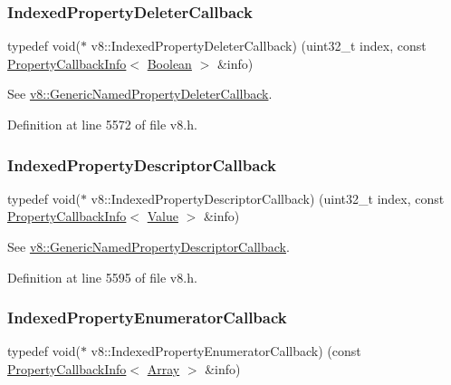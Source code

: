 \mbox{\label{namespacev8_a53863728de14cde48dd6543207b2f2da}} 
\subsubsection{\texorpdfstring{Indexed\+Property\+Deleter\+Callback}{IndexedPropertyDeleterCallback}}
{\footnotesize\ttfamily typedef void($\ast$ v8\+::\+Indexed\+Property\+Deleter\+Callback) (uint32\+\_\+t index, const \mbox{\hyperlink{classv8_1_1PropertyCallbackInfo}{Property\+Callback\+Info}}$<$ \mbox{\hyperlink{classv8_1_1Boolean}{Boolean}} $>$ \&info)}

See {\ttfamily \mbox{\hyperlink{namespacev8_ad2aecc0406ea4bc02d5a4f84a433b273}{v8\+::\+Generic\+Named\+Property\+Deleter\+Callback}}}. 

Definition at line 5572 of file v8.\+h.

\mbox{\label{namespacev8_a7506e91d70d885b5cbeabdf870ac0e88}} 
\subsubsection{\texorpdfstring{Indexed\+Property\+Descriptor\+Callback}{IndexedPropertyDescriptorCallback}}
{\footnotesize\ttfamily typedef void($\ast$ v8\+::\+Indexed\+Property\+Descriptor\+Callback) (uint32\+\_\+t index, const \mbox{\hyperlink{classv8_1_1PropertyCallbackInfo}{Property\+Callback\+Info}}$<$ \mbox{\hyperlink{classv8_1_1Value}{Value}} $>$ \&info)}

See {\ttfamily \mbox{\hyperlink{namespacev8_a8cf8faa26baffa84173a24906c0d49f6}{v8\+::\+Generic\+Named\+Property\+Descriptor\+Callback}}}. 

Definition at line 5595 of file v8.\+h.

\mbox{\label{namespacev8_adbb0a6d5537371953f9ba807d4f6275e}} 
\subsubsection{\texorpdfstring{Indexed\+Property\+Enumerator\+Callback}{IndexedPropertyEnumeratorCallback}}
{\footnotesize\ttfamily typedef void($\ast$ v8\+::\+Indexed\+Property\+Enumerator\+Callback) (const \mbox{\hyperlink{classv8_1_1PropertyCallbackInfo}{Property\+Callback\+Info}}$<$ \mbox{\hyperlink{classv8_1_1Array}{Array}} $>$ \&info)}

